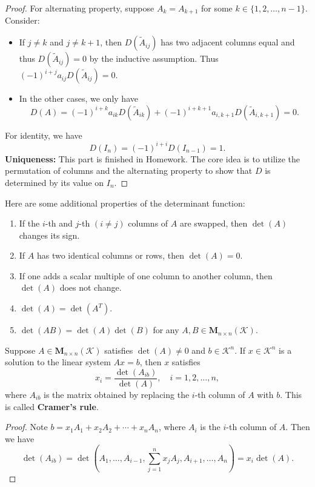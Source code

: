 \documentclass{ctexart}
\newcommand{\M}{\mathbf{M}}
\begin{document}
\begin{proof}
        For alternating property, suppose $A_k = A_{k+1}$ for some $k\in \{1,2,\ldots,n-1\}$. Consider:
        \begin{itemize}
            \item If $j\neq k$ and $j\neq k+1$, then $D(\tilde{A}_{ij})$ has two adjacent columns equal and thus $D(\tilde{A}_{ij})=0$ by the inductive assumption. Thus $(-1)^{i+j} a_{ij} D(\tilde{A}_{ij}) = 0$.
            \item In the other cases, we only have
            \[
            D(A) = (-1)^{i+k} a_{ik} D(\tilde{A}_{ik}) + (-1)^{i+k+1} a_{i,k+1} D(\tilde{A}_{i,k+1}) = 0.
            \]
        \end{itemize}

        For identity, we have
        \[
        D(I_n) = (-1)^{i+i} D(I_{n-1}) = 1.
        \]
        \textbf{Uniqueness:} This part is finished in Homework. The core idea is to utilize the permutation of columns and the alternating property to show that $D$ is determined by its value on $I_n$.
    \end{proof}
    \begin{mythm}
        Here are some additional properties of the determinant function:
        \begin{enumerate}
            \item If the $i$-th and $j$-th $(i\neq j)$ columns of $A$ are swapped, then $\det(A)$ changes its sign.
            \item If $A$ has two identical columns or rows, then $\det(A) = 0$.
            \item If one adds a scalar multiple of one column to another column, then $\det(A)$ does not change.
            \item $\det(A) = \det(A^T)$.
            \item $\det(AB) = \det(A)\det(B)$ for any $A,B \in \mathbf{M}_{n \times n}(\mathcal{K})$.
        \end{enumerate}
    \end{mythm}
    \begin{mythm}
        Suppose $A\in\M_{n \times n}(\mathcal{K})$ satisfies $\det(A) \neq 0$ and $b\in \mathcal{K}^n$. If $x\in \mathcal{K}^n$ is a solution to the linear system $Ax=b$, then $x$ satisfies
        \[
        x_i = \frac{\det(A_{ib})}{\det(A)}, \quad i=1,2,\ldots,n,
        \]
        where $A_{ib}$ is the matrix obtained by replacing the $i$-th column of $A$ with $b$. This is called \textbf{Cramer's rule}.
    \end{mythm}
    \begin{proof}
        Note $b = x_1 A_1 + x_2 A_2 + \cdots + x_n A_n$, where $A_i$ is the $i$-th column of $A$.
        Then we have
        \[
        \det(A_{ib}) = \det(A_1, \ldots, A_{i-1}, \sum_{j=1}^n x_j A_j, A_{i+1}, \ldots, A_n) = x_i \det(A).
        \]
    \end{proof}
\end{document}
